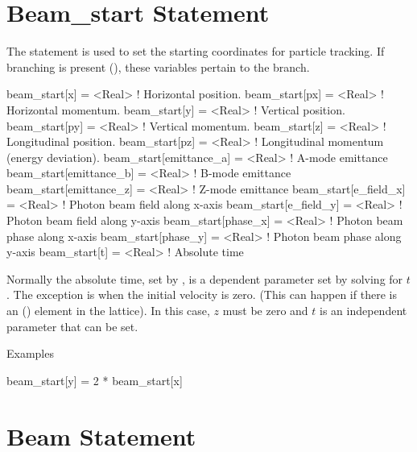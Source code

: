 \section{Beam_start Statement} \label{s:beam.start}

The  statement is used to set the starting coordinates
for particle tracking. If branching is present (), these variables
pertain to the  branch.
\begin{example}
  beam_start[x]           = <Real>   ! Horizontal position.
  beam_start[px]          = <Real>   ! Horizontal momentum.
  beam_start[y]           = <Real>   ! Vertical position.
  beam_start[py]          = <Real>   ! Vertical momentum.
  beam_start[z]           = <Real>   ! Longitudinal position.
  beam_start[pz]          = <Real>   ! Longitudinal momentum (energy deviation).
  beam_start[emittance_a] = <Real>   ! A-mode emittance
  beam_start[emittance_b] = <Real>   ! B-mode emittance
  beam_start[emittance_z] = <Real>   ! Z-mode emittance
  beam_start[e_field_x]   = <Real>   ! Photon beam field along x-axis
  beam_start[e_field_y]   = <Real>   ! Photon beam field along y-axis
  beam_start[phase_x]     = <Real>   ! Photon beam phase along x-axis
  beam_start[phase_y]     = <Real>   ! Photon beam phase along y-axis
  beam_start[t]           = <Real>   ! Absolute time
\end{example}
Normally the absolute time, set by , is a dependent
parameter set by solving  for $t$. The exception is when the
initial velocity is zero. (This can happen if there is an 
() element in the lattice). In this case, $z$ must be
zero and $t$ is an independent parameter that can be set.

\noindent
Examples
\begin{example}
  beam_start[y] = 2 * beam_start[x]
\end{example}

\section{Beam Statement}

